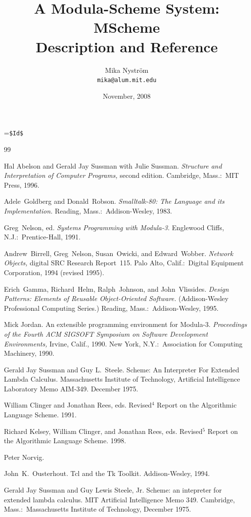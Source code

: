 \documentclass[12pt]{report}
\title{\bfseries\sffamily\fontsize{24.88}{30}\selectfont A Modula-Scheme System: \\ MScheme \\ Description and Reference}
\author{Mika Nystr\"om \\ {\tt mika@alum.mit.edu}}
\date{November, 2008}
\begin{document}
\def\ns{}
\ifx\DIST\undefined
{}=\vbox{\verb+$Id$+}
\fi

\thispagestyle{empty}

\maketitle

\thispagestyle{empty}

\newpage
\tableofcontents
\newpage






\newpage
{
\frenchspacing
\begin{thebibliography}{99}

 Hal Abelson and Gerald Jay Sussman with Julie Sussman.  {\it Structure and Interpretation of Computer Programs,} second edition.  Cambridge, Mass.:\ MIT Press, 1996.

 Adele~Goldberg and Donald~Robson.  {\it Smalltalk-80: The Language and its Implementation.}  Reading, Mass.:\ Addison-Wesley, 1983.

  Greg~Nelson, ed.  {\it Systems Programming with Modula-3.}  Englewood Cliffs, N.J.:\ Prentice-Hall, 1991.

 Andrew~Birrell, Greg~Nelson, Susan~Owicki, and Edward~Wobber.  {\it Network Objects,} digital SRC Research Report~115.  Palo Alto, Calif.:\ Digital Equipment Corporation, 1994 (revised 1995).

 Erich~Gamma, Richard~Helm, Ralph~Johnson, and John~Vlissides.  {\it Design Patterns: Elements of Reusable Object-Oriented Software.}  (Addison-Wesley Professional Computing Series.)  Reading, Mass.:\ Addison-Wesley, 1995.

  Mick Jordan.  An extensible programming environment for Modula-3.  {\it Proceedings of the Fourth ACM SIGSOFT Symposium on Software Development Environments,} Irvine, Calif., 1990.  New York, N.Y.:\ Association for Computing Machinery, 1990.

 Gerald Jay Sussman and Guy L.~Steele. Scheme: An Interpreter For Extended Lambda Calculus.  Massachusetts Institute of Technology, Artificial Intelligence Laboratory Memo AIM-349.  December 1975.
  
 William Clinger and Jonathan Rees, eds.
Revised$^4$ Report on the Algorithmic Language Scheme.  1991.

 Richard Kelsey, William Clinger, and Jonathan Rees, eds.
Revised$^5$ Report on the Algorithmic Language Scheme.  1998.

 Peter Norvig.

 John~K.~Ousterhout.  Tcl and the Tk Toolkit.  Addison-Wesley, 1994.

 Gerald Jay Sussman and Guy Lewis Steele, Jr.  Scheme: an intepreter for extended lambda calculus.  MIT Artificial Intelligence Memo 349.  Cambridge, Mass.:\ Massachusetts Institute of Technology, December 1975.
\end{thebibliography}
}
\end{document}
